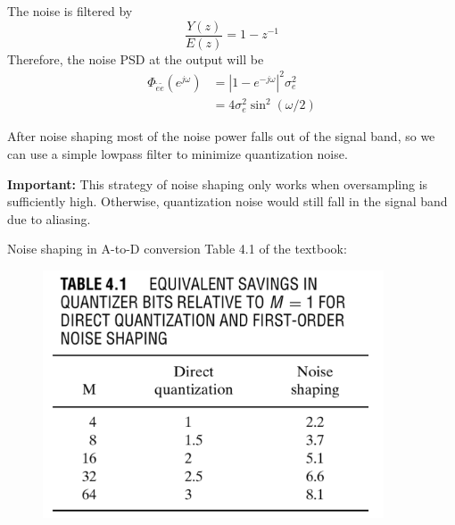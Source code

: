 \documentclass[10pt]{beamer}
\begin{document}
%
\begin{frame}
The noise is filtered by
\begin{equation*}
\frac{Y(z)}{E(z)} = 1 - z^{-1} 
\end{equation*}
Therefore, the noise PSD at the output will be
\begin{align*}
\Phi_{\tilde{e}\tilde{e}}(e^{j\omega}) &= |1 - e^{-j\omega}|^2\sigma_e^2 \tag{since $e[n]$ is white} \\
&= 4\sigma_e^2\sin^2(\omega/2)
\end{align*}

\begin{center}
	\resizebox{0.8\textwidth}{!}{}
\end{center}

After noise shaping most of the noise power falls out of the signal band, so we can use a simple lowpass filter to minimize quantization noise.

\pause
\textbf{Important:} This strategy of noise shaping only works when oversampling is sufficiently high. Otherwise, quantization noise would still fall in the signal band due to aliasing.
\end{frame}

%
\begin{frame}{Noise shaping in A-to-D conversion}
Table 4.1 of the textbook:

\begin{figure}[h!]
	\centering
	\includegraphics[width=0.9\textwidth]{figs/table41.png}
\end{figure}

\end{frame}
\end{document}
